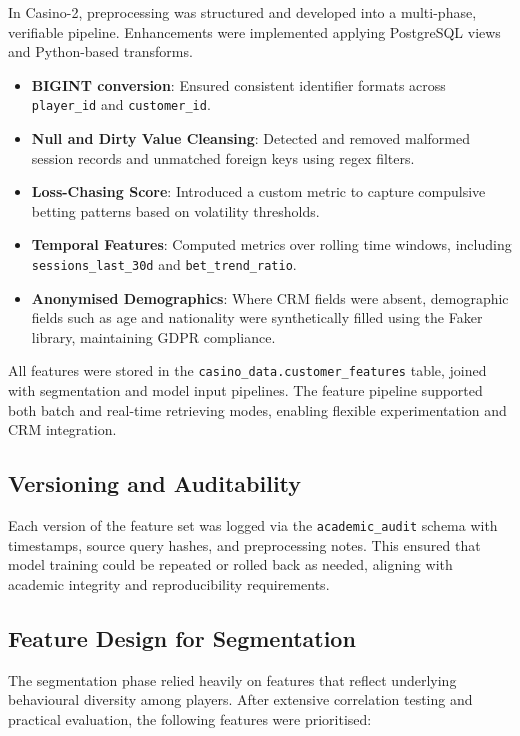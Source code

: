 \documentclass[12pt,a4paper]{report}
\begin{document}
In Casino-2, preprocessing was structured and developed into a multi-phase, verifiable pipeline.  Enhancements were implemented applying PostgreSQL views and Python-based transforms.

\begin{itemize}
  \item \textbf{BIGINT conversion}: Ensured consistent identifier formats across \texttt{player\_id} and \texttt{customer\_id}.
  \item \textbf{Null and Dirty Value Cleansing}: Detected and removed malformed session records and unmatched foreign keys using regex filters.
  \item \textbf{Loss-Chasing Score}: Introduced a custom metric to capture compulsive betting patterns based on volatility thresholds.
  \item \textbf{Temporal Features}: Computed metrics over rolling time windows, including \texttt{sessions\_last\_30d} and \texttt{bet\_trend\_ratio}.
  \item \textbf{Anonymised Demographics}: Where CRM fields were absent, demographic fields such as age and nationality were synthetically filled using the Faker library, maintaining GDPR compliance.
\end{itemize}

All features were stored in the \texttt{casino\_data.customer\_features} table, joined with segmentation and model input pipelines. The feature pipeline supported both batch and real-time retrieving modes, enabling flexible experimentation and CRM integration.

\subsection*{Versioning and Auditability}

Each version of the feature set was logged via the \texttt{academic\_audit} schema with timestamps, source query hashes, and preprocessing notes. This ensured that model training could be repeated or rolled back as needed, aligning with academic integrity and reproducibility requirements.

\subsection{Feature Design for Segmentation}

The segmentation phase relied heavily on features that reflect underlying behavioural diversity among players. After extensive correlation testing and practical evaluation, the following features were prioritised:
\end{document}
